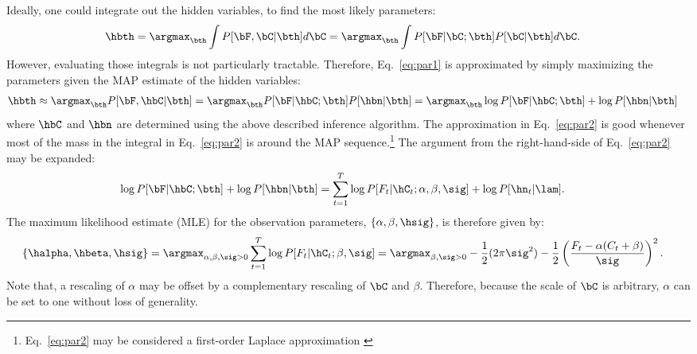Ideally, one could integrate out the hidden variables, to find the most likely parameters:
\begin{align} \label{eq:par1}
\hbth &= \argmax_{\bth} \int P[\bF, \bC | \bth] d\bC  = \argmax_{\bth} \int P[\bF | \bC; \bth] P[\bC | \bth] d\bC.
\end{align}
However, evaluating those integrals is not particularly tractable.
Therefore, Eq.~\eqref{eq:par1} is approximated by simply maximizing the parameters given the MAP estimate of the hidden variables:
\begin{align} \label{eq:par2}
\hbth &\approx \argmax_{\bth} P[\bF, \hbC | \bth] = \argmax_{\bth} P[\bF| \hbC; \bth] P[\hbn | \bth] = \argmax_{\bth} \log P[\bF | \hbC; \bth] + \log P[\hbn | \bth] 
\end{align}
\noindent where $\hbC$ and $\hbn$ are determined using the above described inference algorithm. The approximation in Eq.~\eqref{eq:par2} is good whenever most of the mass in the integral in Eq.~\eqref{eq:par2} is around the MAP sequence.\footnote{Eq.~\eqref{eq:par2} may be considered a first-order Laplace approximation \cite{CONV04}}  The argument from the right-hand-side of Eq.~\eqref{eq:par2} may be expanded: 
\begin{align} \label{eq:par3}
\log P[\bF| \hbC; \bth] + \log P[\hbn | \bth] &= \sum_{t=1}^T \log P[F_t | \hC_t; \alpha, \beta,\sig] + \log P[\hn_t | \lam].
\end{align}
\noindent The maximum likelihood estimate (MLE) for the observation parameters, $\{\alpha,\beta,\hsig\}$, is therefore given by:
\begin{align} \label{eq:beta,sig}
	\{\halpha, \hbeta,\hsig\} &=  \argmax_{\alpha, \beta,\sig >0} \sum_{t=1}^T \log P[F_t | \hC_t; \beta,\sig]
	=  \argmax_{\beta,\sig >0} 	-\frac{1}{2} (2\pi \sig^2) - \frac{1}{2} \left(\frac{F_t-\alpha(C_t+\beta)}{\sig}\right)^2. %
\end{align}
Note that, a rescaling of $\alpha$ may be offset by a complementary rescaling of $\bC$ and $\beta$.  Therefore, because the scale of $\bC$ is arbitrary, $\alpha$ can be set to one without loss of generality.  
